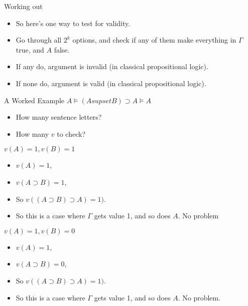 \documentclass[
  17pt,
  letterpaper,
  ignorenonframetext,
  aspectratio=169,
  handout]{beamer}
\providecommand{\tightlist}{%
  \setlength{\itemsep}{0pt}\setlength{\parskip}{0pt}}\usepackage{longtable,booktabs,array}
\begin{document}
\begin{frame}{Working out}
\protect\hypertarget{working-out-1}{}
\begin{itemize}[<+->]
\tightlist
\item
  So here's one way to test for validity.
\item
  Go through all \(2^k\) options, and check if any of them make
  everything in \(\Gamma\) true, and \(A\) false.
\item
  If any do, argument is invalid (in classical propositional logic).
\item
  If none do, argument is valid (in classical propositional logic).
\end{itemize}
\end{frame}

\begin{frame}{A Worked Example}
\protect\hypertarget{a-worked-example}{}
\(A \vDash (A supset B) \supset A \vDash A\)

\begin{itemize}[<+->]
\tightlist
\item
  How many sentence letters?
\item
  How many \(v\) to check?
\end{itemize}
\end{frame}

\begin{frame}{\(v(A) = 1, v(B) = 1\)}
\protect\hypertarget{va-1-vb-1}{}
\begin{itemize}[<+->]
\tightlist
\item
  \(v(A) = 1\),
\item
  \(v(A \supset B) = 1\),
\item
  So \(v((A \supset B) \supset A) = 1)\).
\item
  So this is a case where \(\Gamma\) gets value 1, and so does \(A\). No
  problem
\end{itemize}
\end{frame}

\begin{frame}{\(v(A) = 1, v(B) = 0\)}
\protect\hypertarget{va-1-vb-0}{}
\begin{itemize}[<+->]
\tightlist
\item
  \(v(A) = 1\),
\item
  \(v(A \supset B) = 0\),
\item
  So \(v((A \supset B) \supset A) = 1)\).
\item
  So this is a case where \(\Gamma\) gets value 1, and so does \(A\). No
  problem.
\end{itemize}
\end{frame}
\end{document}
